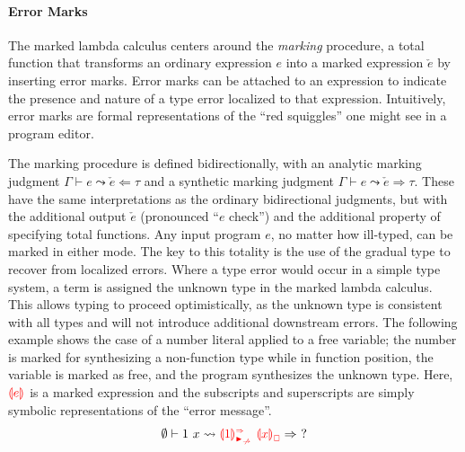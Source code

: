 \documentclass[acmsmall,dvipsnames,10pt,nonacm]{acmart}\settopmatter{printfolios=true} %
\newcommand{\THole}{\ensuremath{?}}
\newcommand{\ctx}{\ensuremath{\Gamma}}
\newcommand{\VV}{\ensuremath{x}}
\newcommand{\notMatchedRel}[1]{\ensuremath{\blacktriangleright_{\centernot#1}}}
\newcommand{\notMatchedArrowRel}{\ensuremath{\notMatchedRel{\to}}}
\newcommand{\ECAp}[2]{\ensuremath{#1 ~#2}}
\newcommand{\MRFree}{\ensuremath{\mathsmaller{\mathsmaller{\mathsmaller{\square}}}}}
\newcommand{\MRSynNonMatchedArrow}{\ensuremath{\mathsmaller{\notMatchedArrowRel}}}
\newcommand{\MRSyn}{\ensuremath{\mathsmaller{\Rightarrow}}}
\newcommand{\ECMarked}[3]{\ensuremath{\textcolor{red}{\bm{\llparenthesis}#1\bm{\rrparenthesis}_{#2}^{#3}}}}
\newcommand{\ECMarkedFree}[1]{\ensuremath{\ECMarked{#1}{\MRFree}{}}}
\newcommand{\ECMarkedSynNonMatchedArrow}[1]{\ensuremath{\ECMarked{#1}{\MRSynNonMatchedArrow}{\MRSyn}}}
\newcommand{\ECFree}[1]{\ensuremath{\ECMarkedFree{#1}}}
\newcommand{\ECSynNonMatchedArrow}[1]{\ensuremath{\ECMarkedSynNonMatchedArrow{#1}}}
\newcommand{\ECApSynNonMatchedArrow}[2]{\ensuremath{\ECAp{\ECSynNonMatchedArrow{#1}}{#2}}}
\newcommand{\MarkProg}[2]{#1\leadsto#2}
\begin{document}
\paragraph{Error Marks} The marked lambda calculus centers around the \textit{marking} procedure, a total function that transforms an ordinary expression $e$ into a marked expression $\check{e}$ by inserting error marks. Error marks can be attached to an expression to indicate the presence and nature of a type error localized to that expression. Intuitively, error marks are formal representations of the ``red squiggles'' one might see in a program editor.

The marking procedure is defined bidirectionally, with an analytic marking judgment $\ctx\vdash \MarkProg{e}{\check{e}}\Leftarrow\tau$ and a synthetic marking judgment $\ctx\vdash \MarkProg{e}{\check{e}}\Rightarrow\tau$. These have the same interpretations as the ordinary bidirectional judgments, but with the additional output $\check{e}$ (pronounced ``$e$ check'') and the additional property of specifying total functions. Any input program $e$, no matter how ill-typed, can be marked in either mode. The key to this totality is the use of the gradual type to recover from localized errors. Where a type error would occur in a simple type system, a term is assigned the unknown type in the marked lambda calculus. This allows typing to proceed optimistically, as the unknown type is consistent with all types and will not introduce additional downstream errors. The following example shows the case of a number literal applied to a free variable; the number is marked for synthesizing a non-function type while in function position, the variable is marked as free, and the program synthesizes the unknown type. Here, $\ECMarked{e}{}{}$ is a marked expression and the subscripts and superscripts are simply symbolic representations of the ``error message''.
\[
\centering
\emptyset\vdash \MarkProg{1~\VV}{\ECApSynNonMatchedArrow{1}{\ECFree{\VV}}}\Rightarrow~\THole
\]

\end{document}
